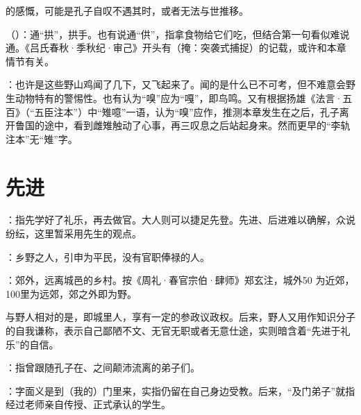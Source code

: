 {\item {}的感慨，可能是孔子自叹不遇其时，或者无法与世推移。
\item {}（）：通“拱”，拱手。也有说通“供”，指拿食物给它们吃，但结合第一句看似难说通。《吕氏春秋·季秋纪·审己》开头有（掩：突袭式捕捉）的记载，或许和本章情节有关。
\item {}：也许是这些野山鸡闻了几下，又飞起来了。闻的是什么已不可考，但不难意会野生动物特有的警惕性。也有认为“嗅”应为“嘎”，即鸟鸣。又有根据扬雄《法言·五百》（“五臣注本”）中“雉噫”一语，认为“嗅”应作，推测本章发生在之后，孔子离开鲁国的途中，看到雌雉触动了心事，再三叹息之后站起身来。然而更早的“李轨注本”无“雉”字。
}
{}



\chapter{先进}

{
\item {}：指先学好了礼乐，再去做官。大人则可以捷足先登。先进、后进难以确解，众说纷纭，这里暂采用先生的观点。

\item {}：乡野之人，引申为平民，没有官职俸禄的人。

：郊外，远离城邑的乡村。按《周礼·春官宗伯·肆师》郑玄注，城外50 为近郊，100里为远郊，郊之外即为野。

与野人相对的是，即城里人，享有一定的参政议政权。后来，野人又用作知识分子的自我谦称，表示自己鄙陋不文、无官无职或者无意仕途，实则暗含着“先进于礼乐”的自信。
}
{}


{
\item {}：指曾跟随孔子在、之间颠沛流离的弟子们。%
\item {}：字面义是到（我的）门里来，实指仍留在自己身边受教。后来，“及门弟子”就指经过老师亲自传授、正式承认的学生。
}
{}


